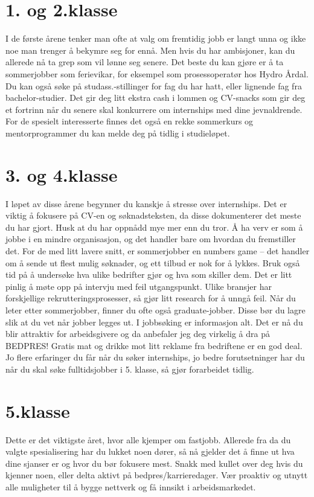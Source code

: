 \section*{1. og 2.klasse}

I de første årene tenker man ofte at valg om fremtidig jobb er langt unna og ikke noe man trenger å bekymre seg for ennå. Men hvis du har ambisjoner, kan du allerede nå ta grep som vil lønne seg senere. Det beste du kan gjøre er å ta sommerjobber som ferievikar, for eksempel som prosessoperatør hos Hydro Årdal. Du kan også søke på studass.-stillinger for fag du har hatt, eller lignende fag fra bachelor-studier. Det gir deg litt ekstra cash i lommen og CV-snacks som gir deg et fortrinn når du senere skal konkurrere om internships med dine jevnaldrende. For de spesielt interesserte finnes det også en rekke sommerkurs og mentorprogrammer du kan melde deg på tidlig i studieløpet.

\section*{3. og 4.klasse}

I løpet av disse årene begynner du kanskje å stresse over internships. Det er viktig å fokusere på CV-en og søknadsteksten, da disse dokumenterer det meste du har gjort. Husk at du har oppnådd mye mer enn du tror. Å ha verv er som å jobbe i en mindre organisasjon, og det handler bare om hvordan du fremstiller det. For de med litt lavere snitt, er sommerjobber en numbers game – det handler om å sende ut flest mulig søknader, og ett tilbud er nok for å lykkes. Bruk også tid på å undersøke hva ulike bedrifter gjør og hva som skiller dem. Det er litt pinlig å møte opp på intervju med feil utgangspunkt. Ulike bransjer har forskjellige rekrutteringsprosesser, så gjør litt research for å unngå feil. Når du leter etter sommerjobber, finner du ofte også graduate-jobber. Disse bør du lagre slik at du vet når jobber legges ut. I jobbsøking er informasjon alt. Det er nå du blir attraktiv for arbeidsgivere og da anbefaler jeg deg virkelig å dra på BEDPRES! Gratis mat og drikke mot litt reklame fra bedriftene er en god deal. Jo flere erfaringer du får når du søker internships, jo bedre forutsetninger har du når du skal søke fulltidsjobber i 5. klasse, så gjør forarbeidet tidlig.

\section*{5.klasse}

Dette er det viktigste året, hvor alle kjemper om fastjobb. Allerede fra da du valgte spesialisering har du lukket noen dører, så nå gjelder det å finne ut hva dine sjanser er og hvor du bør fokusere mest. Snakk med kullet over deg hvis du kjenner noen, eller delta aktivt på bedpres/karrieredager. Vær proaktiv og utnytt alle muligheter til å bygge nettverk og få innsikt i arbeidsmarkedet.